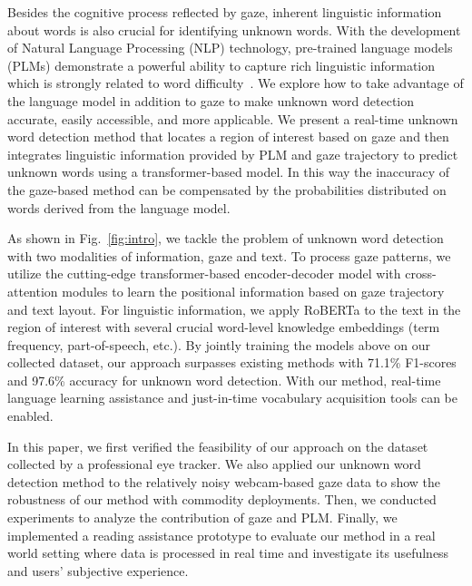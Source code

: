 Besides the cognitive process reflected by gaze, inherent linguistic information about words is also crucial for identifying unknown words. With the development of Natural Language Processing (NLP) technology, pre-trained language models (PLMs) demonstrate a powerful ability to capture rich linguistic information~\cite{devlin2019bert, liu2019roberta} which is strongly related to word difficulty~\cite{More_than_frequency}.
We explore how to take advantage of the language model in addition to gaze to make unknown word detection accurate, easily accessible, and more applicable. We present a real-time unknown word detection method that locates a region of interest based on gaze and then integrates linguistic information provided by PLM and gaze trajectory to predict unknown words using a transformer-based model. In this way the inaccuracy of the gaze-based method can be compensated by the probabilities distributed on words derived from the language model.

As shown in Fig.~\ref{fig:intro}, we tackle the problem of unknown word detection with two modalities of information, gaze and text. To process gaze patterns, we utilize the cutting-edge transformer-based encoder-decoder model with cross-attention modules to learn the positional information based on gaze trajectory and text layout. For linguistic information, we apply RoBERTa to the text in the region of interest with several crucial word-level knowledge embeddings (term frequency, part-of-speech, etc.). By jointly training the models above on our collected dataset, our approach surpasses existing methods with 71.1\% F1-scores and 97.6\% accuracy for unknown word detection.
With our method, real-time language learning assistance and just-in-time vocabulary acquisition tools can be enabled.

In this paper, we first verified the feasibility of our approach on the dataset collected by a professional eye tracker. We also applied our unknown word detection method to the relatively noisy webcam-based gaze data to show the robustness of our method with commodity deployments. Then, we conducted experiments to analyze the contribution of gaze and PLM. Finally, we implemented a reading assistance prototype to evaluate our method in a real world setting where data is processed in real time and investigate its usefulness and users' subjective experience.

